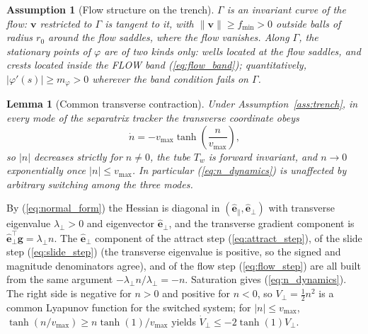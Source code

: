 \documentclass[lettersize,journal]{IEEEtran}
\newtheorem{lemma}{Lemma}
\newtheorem{assumption}{Assumption}
\begin{document}
\begin{assumption}[Flow structure on the trench]
\label{ass:flow}
$\Gamma$ is an invariant curve of the flow: $\mathbf{v}$ restricted to
$\Gamma$ is tangent to it, with $\|\mathbf{v}\| \geq f_{\min} > 0$
outside balls of radius $r_0$ around the flow saddles, where the flow
vanishes. Along $\Gamma$, the stationary points of $\varphi$ are of two
kinds only: wells located at the flow saddles, and crests located inside
the FLOW band (\ref{eq:flow_band}); quantitatively, $|\varphi'(s)| \geq
m_\varphi > 0$ wherever the band condition fails on $\Gamma$.
\end{assumption}

\begin{lemma}[Common transverse contraction]
\label{lem:transverse}
Under Assumption~\ref{ass:trench}, in every mode of the separatrix
tracker the transverse coordinate obeys
\begin{equation}
    \dot{n} = -v_{\max}\tanh\!\left(\frac{n}{v_{\max}}\right),
    \label{eq:n_dynamics}
\end{equation}
so $|n|$ decreases strictly for $n \neq 0$, the tube $T_w$ is forward
invariant, and $n \to 0$ exponentially once $|n| \leq v_{\max}$. In
particular (\ref{eq:n_dynamics}) is unaffected by arbitrary switching
among the three modes.
\end{lemma}

\begin{IEEEproof}
By (\ref{eq:normal_form}) the Hessian is diagonal in
$(\hat{\mathbf{e}}_\parallel, \hat{\mathbf{e}}_\perp)$ with transverse
eigenvalue $\lambda_\perp > 0$ and eigenvector
$\hat{\mathbf{e}}_\perp$, and the transverse gradient component is
$\hat{\mathbf{e}}_\perp^\top \mathbf{g} = \lambda_\perp n$. The
$\hat{\mathbf{e}}_\perp$ component of the attract step
(\ref{eq:attract_step}), of the slide step (\ref{eq:slide_step}) (the
transverse eigenvalue is positive, so the signed and magnitude
denominators agree), and of the flow step (\ref{eq:flow_step}) are all
built from the same argument $-\lambda_\perp n / \lambda_\perp = -n$.
Saturation gives (\ref{eq:n_dynamics}). The right side is negative for $n > 0$ and
positive for $n < 0$, so $V_\perp = \tfrac{1}{2}n^2$ is a common
Lyapunov function for the switched system; for $|n| \leq v_{\max}$,
$\tanh(n/v_{\max}) \geq n \tanh(1)/v_{\max}$ yields $\dot{V}_\perp \leq
-2\tanh(1) V_\perp$.
\end{IEEEproof}
\end{document}
